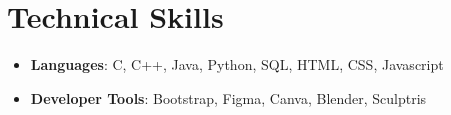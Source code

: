 \documentclass[letterpaper,11pt]{article}
\newcommand{\resumeItem}[1]{\item\small{#1 \vspace{-2pt}}}
\newcommand{\resumeItemListStart}{\begin{itemize}}
\newcommand{\resumeItemListEnd}{\end{itemize}\vspace{-5pt}}
\newcommand{\resumeSubHeadingListStart}{\begin{itemize}[leftmargin=0.15in, label={}]}
\newcommand{\resumeSubHeadingListEnd}{\end{itemize}}
\begin{document}
\section{Technical Skills}
\resumeSubHeadingListStart
  \resumeItemListStart
    \resumeItem{\textbf{Languages}: C, C++, Java, Python, SQL, HTML, CSS, Javascript}
    \resumeItem{\textbf{Developer Tools}: Bootstrap, Figma, Canva, Blender, Sculptris}
  \resumeItemListEnd
\resumeSubHeadingListEnd
\end{document}
